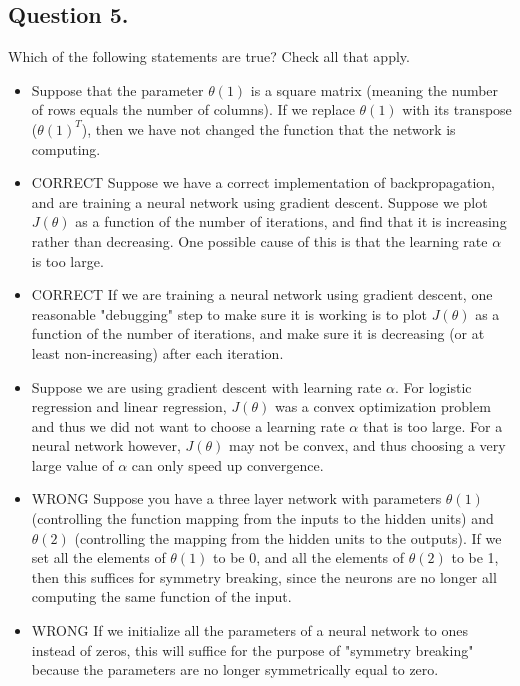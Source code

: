 \documentclass[11pt]{article} %
\begin{document}
\subsection*{ Question 5. }
Which of the following statements are true? Check all that apply.

\begin{itemize}
	\item Suppose that the parameter $\theta(1)$ is a square matrix (meaning the number of rows equals the number of columns). If we replace $\theta(1)$ with its transpose ($\theta(1)^T$), then we have not changed the function that the network is computing.
	
	\item CORRECT Suppose we have a correct implementation of backpropagation, and are training a neural network using gradient descent. Suppose we plot $J(\theta)$ as a function of the number of iterations, and find that it is increasing rather than decreasing. One possible cause of this is that the learning rate $\alpha$ is too large.
	
	\item CORRECT If we are training a neural network using gradient descent, one reasonable "debugging" step to make sure it is working is to plot $J(\theta)$ as a function of the number of iterations, and make sure it is decreasing (or at least non-increasing) after each iteration.
	
	\item Suppose we are using gradient descent with learning rate $\alpha$. For logistic regression and linear regression, $J(\theta)$ was a convex optimization problem and thus we did not want to choose a learning rate $\alpha$ that is too large. For a neural network however, $J(\theta)$ may not be convex, and thus choosing a very large value of $\alpha$ can only speed up convergence.
	
	
	\item WRONG Suppose you have a three layer network with parameters $\theta(1)$ (controlling the function mapping from the inputs to the hidden units) and $\theta(2)$ (controlling the mapping from the hidden units to the outputs). If we set all the elements of $\theta(1)$ to be 0, and all the elements of $\theta(2)$ to be 1, then this suffices for symmetry breaking, since the neurons are no longer all computing the same function of the input.
	
	\item WRONG If we initialize all the parameters of a neural network to ones instead of zeros, this will suffice for the purpose of "symmetry breaking" because the parameters are no longer symmetrically equal to zero.
	
	
	
	
\end{itemize}
\end{document}
